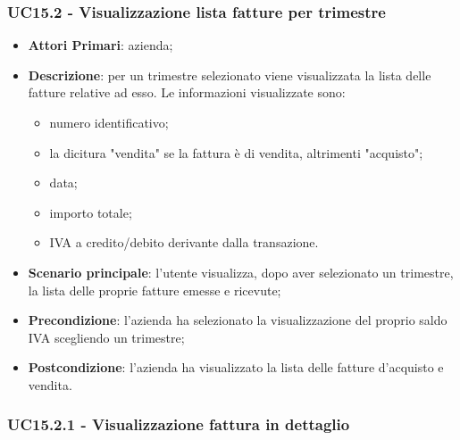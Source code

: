 \subsubsection{UC15.2 - Visualizzazione lista fatture per trimestre}
\begin{itemize}
	\item \textbf{Attori Primari}: azienda;
	\item \textbf{Descrizione}: per un trimestre selezionato viene visualizzata la lista delle fatture relative ad esso. Le informazioni visualizzate sono:
	\begin{itemize}
		\item numero identificativo;
		\item la dicitura "vendita" se la fattura è di vendita, altrimenti "acquisto";
		\item data;
		\item importo totale;
		\item IVA a credito/debito derivante dalla transazione.
	\end{itemize}
	\item \textbf{Scenario principale}: l'utente visualizza, dopo aver selezionato un trimestre, la lista delle proprie fatture emesse e ricevute;
	\item \textbf{Precondizione}: l'azienda ha selezionato la visualizzazione del proprio saldo IVA scegliendo un trimestre;
	\item \textbf{Postcondizione}: l'azienda ha visualizzato la lista delle fatture d'acquisto e vendita.
\end{itemize}

\subsubsection{UC15.2.1 - Visualizzazione fattura in dettaglio}

